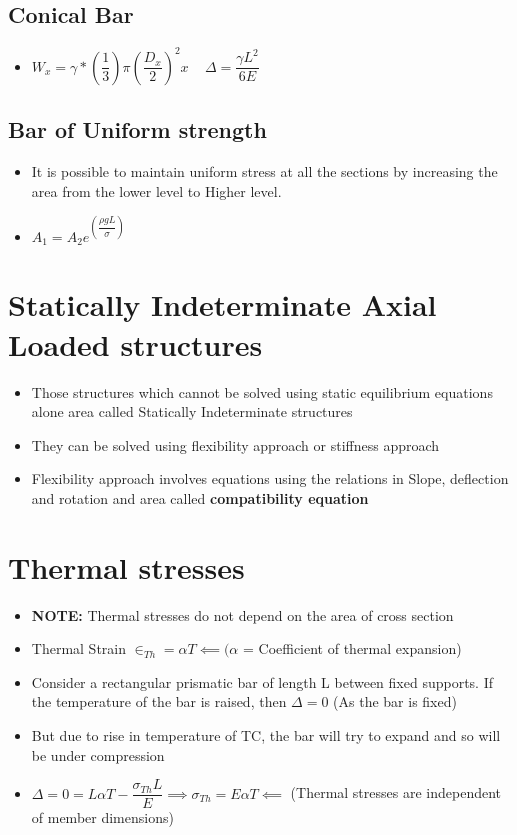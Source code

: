 \documentclass[8pt]{report}
\begin{document}
		\subsection{Conical Bar}
			\begin{itemize}
				\item $\boxed{W_x = \gamma*\left(\dfrac{1}{3}\right)\pi\left(\dfrac{D_x}{2}\right)^2x}$ $\;\;\;\boxed{\Delta = \dfrac{\gamma L^2}{6E}}$
			\end{itemize}
		\subsection{Bar of Uniform strength}
			\begin{itemize}
				\item It is possible to maintain uniform stress at all the sections by increasing the area from the lower level to Higher level.
				\item $\boxed{A_1=A_2e^{\left(\dfrac{\rho gL}{\sigma}\right)}}$
			\end{itemize}\hrulefill
	\section{Statically Indeterminate Axial Loaded structures}
		\begin{itemize}
			\item Those structures which cannot be solved using static equilibrium equations alone area called Statically Indeterminate structures
			\item They can be solved using flexibility approach or stiffness approach
			\item Flexibility approach involves equations using the relations in Slope, deflection and rotation and area called \textbf{compatibility equation}
		\end{itemize}\hrulefill
	\section{Thermal stresses}
		\begin{itemize}
			\item \textbf{NOTE: }Thermal stresses do not depend on the area of cross section
			\item Thermal Strain $\boxed{\in_{Th} = \alpha T} \impliedby (\alpha$ = Coefficient of thermal expansion)
			\item Consider a rectangular prismatic bar of length L between fixed supports. If the temperature of the bar is raised, then $\Delta = 0$ (As the bar is fixed)
			\item But due to rise in temperature of T\textdegree C, the bar will try to expand and so will be under compression
			\item $\Delta = 0 = L\alpha T - \dfrac{\sigma_{Th} L}{E} \implies \boxed{\sigma_{Th} = E\alpha T} \impliedby$ (Thermal stresses are independent of member dimensions)
		\end{itemize}\hrulefill
\end{document}
